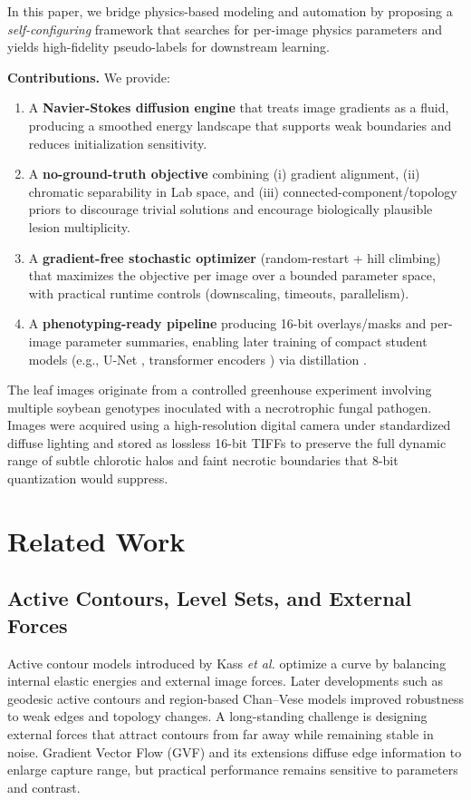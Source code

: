 \documentclass[journal]{IEEEtran}
\begin{document}
In this paper, we bridge physics-based modeling and automation by proposing a \emph{self-configuring} framework that searches for per-image physics parameters and yields high-fidelity pseudo-labels for downstream learning.

\textbf{Contributions.} We provide:
\begin{enumerate}
    \item A \textbf{Navier-Stokes diffusion engine} that treats image gradients as a fluid, producing a smoothed energy landscape that supports weak boundaries and reduces initialization sensitivity.
    \item A \textbf{no-ground-truth objective} combining (i) gradient alignment, (ii) chromatic separability in Lab space, and (iii) connected-component/topology priors to discourage trivial solutions and encourage biologically plausible lesion multiplicity.
    \item A \textbf{gradient-free stochastic optimizer} (random-restart + hill climbing) that maximizes the objective per image over a bounded parameter space, with practical runtime controls (downscaling, timeouts, parallelism).
    \item A \textbf{phenotyping-ready pipeline} producing 16-bit overlays/masks and per-image parameter summaries, enabling later training of compact student models (e.g., U-Net \cite{ronneberger2015u}, transformer encoders \cite{oquab2023dinov2}) via distillation \cite{hinton2015distilling}.
\end{enumerate}

The leaf images originate from a controlled greenhouse experiment involving multiple soybean genotypes inoculated with a necrotrophic fungal pathogen. Images were acquired using a high-resolution digital camera under standardized diffuse lighting and stored as lossless 16-bit TIFFs to preserve the full dynamic range of subtle chlorotic halos and faint necrotic boundaries that 8-bit quantization would suppress.

\section{Related Work}

\subsection{Active Contours, Level Sets, and External Forces}
Active contour models introduced by Kass \emph{et al.} \cite{kass1988snakes} optimize a curve by balancing internal elastic energies and external image forces. Later developments such as geodesic active contours \cite{caselles1997geodesic} and region-based Chan--Vese models \cite{chan2001active} improved robustness to weak edges and topology changes. A long-standing challenge is designing external forces that attract contours from far away while remaining stable in noise. Gradient Vector Flow (GVF) \cite{xu1998gvf} and its extensions diffuse edge information to enlarge capture range, but practical performance remains sensitive to parameters and contrast.
\end{document}
